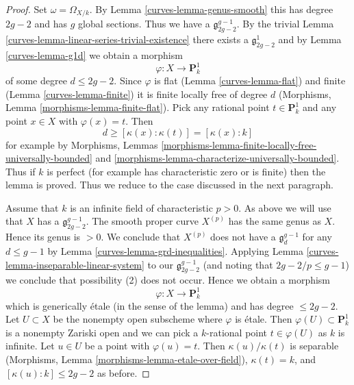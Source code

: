\begin{proof}

Set $\omega = \Omega_{X/k}$. By
Lemma \ref{curves-lemma-genus-smooth} this has degree $2g - 2$
and has $g$ global sections. Thus we have a $\mathfrak g^{g - 1}_{2g - 2}$.
By the trivial Lemma \ref{curves-lemma-linear-series-trivial-existence}
there exists a $\mathfrak g^1_{2g - 2}$
and by Lemma \ref{curves-lemma-g1d} we obtain a morphism
$$
\varphi : X \longrightarrow \mathbf{P}^1_k
$$
of some degree $d \leq 2g - 2$. Since $\varphi$ is flat
(Lemma \ref{curves-lemma-flat}) and finite
(Lemma \ref{curves-lemma-finite})
it is finite locally free of degree $d$
(Morphisms, Lemma \ref{morphisms-lemma-finite-flat}).
Pick any rational point $t \in \mathbf{P}^1_k$
and any point $x \in X$ with $\varphi(x) = t$.
Then
$$
d \geq [\kappa(x) : \kappa(t)] = [\kappa(x) : k]
$$
for example by
Morphisms, Lemmas \ref{morphisms-lemma-finite-locally-free-universally-bounded}
and \ref{morphisms-lemma-characterize-universally-bounded}.
Thus if $k$ is perfect (for example has characteristic zero
or is finite) then the lemma is proved. Thus we reduce to the
case discussed in the next paragraph.

\medskip\noindent
Assume that $k$ is an infinite field of characteristic $p > 0$.
As above we will use that $X$ has a $\mathfrak g^{g - 1}_{2g - 2}$.
The smooth proper curve $X^{(p)}$ has the same genus as $X$.
Hence its genus is $> 0$. We conclude that $X^{(p)}$ does not have a
$\mathfrak g^{g - 1}_d$ for any $d \leq g - 1$ by
Lemma \ref{curves-lemma-grd-inequalities}.
Applying Lemma \ref{curves-lemma-inseparable-linear-system}
to our $\mathfrak g^{g - 1}_{2g - 2}$ (and noting that $2g - 2/p \leq g - 1$)
we conclude that possibility (2) does not occur. Hence we obtain a morphism
$$
\varphi : X \longrightarrow \mathbf{P}^1_k
$$
which is generically \'etale (in the sense of the lemma)
and has degree $\leq 2g - 2$. Let $U \subset X$ be the nonempty
open subscheme where $\varphi$ is \'etale. Then
$\varphi(U) \subset \mathbf{P}^1_k$ is a nonempty Zariski open
and we can pick a $k$-rational point $t \in \varphi(U)$ as $k$ is infinite.
Let $u \in U$ be a point with $\varphi(u) = t$.
Then $\kappa(u)/\kappa(t)$ is separable
(Morphisms, Lemma \ref{morphisms-lemma-etale-over-field}),
$\kappa(t) = k$, and $[\kappa(u) : k] \leq 2g - 2$ as before.
\end{proof}

